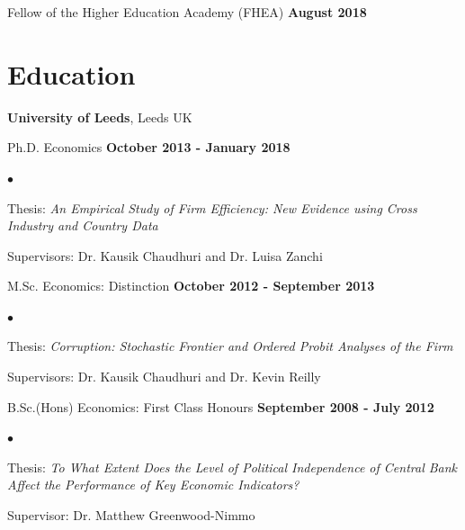 \documentclass[margin,line,9pt]{res}
\newenvironment{list1}{
  \begin{list}{\ding{113}}{%
      \setlength{\itemsep}{0in}
      \setlength{\parsep}{0in} \setlength{\parskip}{0in}
      \setlength{\topsep}{0in} \setlength{\partopsep}{0in}
      \setlength{\leftmargin}{0.17in}}}{\end{list}}
\newenvironment{list2}{
  \begin{list}{$\bullet$}{%
      \setlength{\itemsep}{0in}
      \setlength{\parsep}{0in} \setlength{\parskip}{0in}
      \setlength{\topsep}{0in} \setlength{\partopsep}{0in}
      \setlength{\leftmargin}{0.2in}}}{\end{list}}
\begin{document}
\begin{resume}
Fellow of the Higher Education Academy (FHEA) \hfill {\bf August 2018}

\vspace*{.1in}
\section{\sc Education}
{\bf University of Leeds}, Leeds UK\\
\vspace*{-.1in}
\begin{list1}
\item[] Ph.D. Economics  \hfill {\bf October 2013 - January 2018}
\begin{list2}
\vspace*{.05in}
\item Thesis: \textit{An Empirical Study of Firm Efficiency: New Evidence using Cross Industry and Country Data}
\item Supervisors:  Dr. Kausik Chaudhuri and Dr. Luisa Zanchi
\end{list2}
\end{list1}

\vspace*{.1in}
\begin{list1}
\item[] M.Sc. Economics: Distinction \hfill {\bf October 2012 - September 2013}
\vspace*{.05in}
\begin{list2}
\item Thesis: \textit{Corruption: Stochastic Frontier and Ordered Probit Analyses of the Firm}
\item Supervisors:  Dr. Kausik Chaudhuri and Dr. Kevin Reilly
\end{list2}
\end{list1}

\vspace*{.1in}
\begin{list1}
\item[] B.Sc.(Hons) Economics: First Class Honours \hfill {\bf September 2008 - July 2012}
\vspace*{.05in}
\begin{list2}
\item Thesis: \textit{To What Extent Does the Level of Political Independence of Central Bank Affect the Performance of Key Economic Indicators?}
\item Supervisor: Dr. Matthew Greenwood-Nimmo
\end{list2}
\end{list1}


\end{resume}
\end{document}

